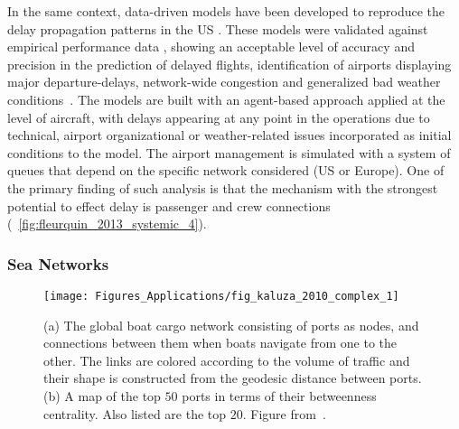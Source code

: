 In the same context, data-driven models have been developed to reproduce the delay propagation patterns in the US \cite{pyrgiotis_2013_modelling}. These models were validated against empirical performance data \cite{campanelli_2015_modelling}, showing an acceptable level of accuracy and precision in the prediction of delayed flights, identification of airports displaying major departure-delays, network-wide congestion and generalized bad weather conditions~\cite{fleurquin_2013_systemic}. The models are built with an agent-based approach applied at the level of aircraft, with delays appearing at any point in the operations due to technical, airport organizational or weather-related issues incorporated as initial conditions to the model. The airport management is simulated with a system of queues that depend on the specific network considered (US or Europe). One of the primary finding of such analysis is that the mechanism with the strongest potential to effect delay is passenger and crew connections (\figurename~\ref{fig:fleurquin_2013_systemic_4}). 

\subsubsection{Sea Networks}

\begin{figure}[t!]
\centering
\texttt{[image: Figures\_Applications/fig\_kaluza\_2010\_complex\_1]}
\caption{(a) The global boat cargo network consisting of ports as nodes, and connections between them when boats navigate from one to the other. The links are colored according to the volume of traffic and their shape is constructed from the geodesic distance between ports. (b) A map of the top $50$ ports in terms of their betweenness centrality. Also listed are the top $20$. Figure from~\cite{kaluza_2010_complex}. \label{fig:kaluza_2010_complex_1}}
\end{figure}


